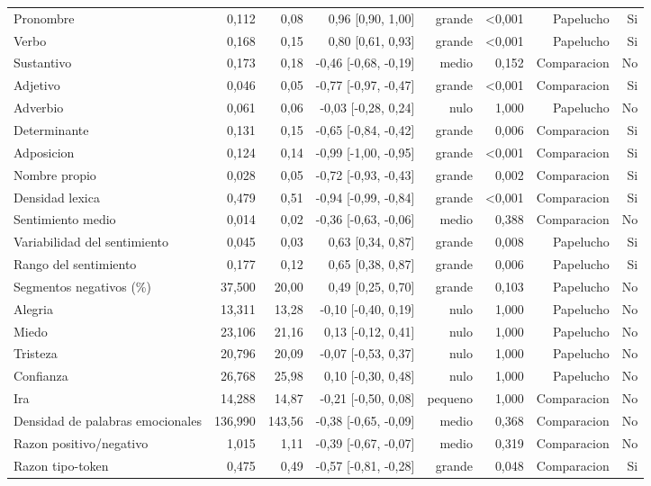 \begin{table}[htbp]
\begin{tabular}{lrrrrrrr}
Pronombre & 0,112 & 0,08 & 0,96 [0,90, 1,00] & grande & <0,001 & Papelucho & Si \\
Verbo & 0,168 & 0,15 & 0,80 [0,61, 0,93] & grande & <0,001 & Papelucho & Si \\
Sustantivo & 0,173 & 0,18 & -0,46 [-0,68, -0,19] & medio & 0,152 & Comparacion & No \\
Adjetivo & 0,046 & 0,05 & -0,77 [-0,97, -0,47] & grande & <0,001 & Comparacion & Si \\
Adverbio & 0,061 & 0,06 & -0,03 [-0,28, 0,24] & nulo & 1,000 & Papelucho & No \\
Determinante & 0,131 & 0,15 & -0,65 [-0,84, -0,42] & grande & 0,006 & Comparacion & Si \\
Adposicion & 0,124 & 0,14 & -0,99 [-1,00, -0,95] & grande & <0,001 & Comparacion & Si \\
Nombre propio & 0,028 & 0,05 & -0,72 [-0,93, -0,43] & grande & 0,002 & Comparacion & Si \\
Densidad lexica & 0,479 & 0,51 & -0,94 [-0,99, -0,84] & grande & <0,001 & Comparacion & Si \\
Sentimiento medio & 0,014 & 0,02 & -0,36 [-0,63, -0,06] & medio & 0,388 & Comparacion & No \\
Variabilidad del sentimiento & 0,045 & 0,03 & 0,63 [0,34, 0,87] & grande & 0,008 & Papelucho & Si \\
Rango del sentimiento & 0,177 & 0,12 & 0,65 [0,38, 0,87] & grande & 0,006 & Papelucho & Si \\
Segmentos negativos (\%) & 37,500 & 20,00 & 0,49 [0,25, 0,70] & grande & 0,103 & Papelucho & No \\
Alegria & 13,311 & 13,28 & -0,10 [-0,40, 0,19] & nulo & 1,000 & Papelucho & No \\
Miedo & 23,106 & 21,16 & 0,13 [-0,12, 0,41] & nulo & 1,000 & Papelucho & No \\
Tristeza & 20,796 & 20,09 & -0,07 [-0,53, 0,37] & nulo & 1,000 & Papelucho & No \\
Confianza & 26,768 & 25,98 & 0,10 [-0,30, 0,48] & nulo & 1,000 & Papelucho & No \\
Ira & 14,288 & 14,87 & -0,21 [-0,50, 0,08] & pequeno & 1,000 & Comparacion & No \\
Densidad de palabras emocionales & 136,990 & 143,56 & -0,38 [-0,65, -0,09] & medio & 0,368 & Comparacion & No \\
Razon positivo/negativo & 1,015 & 1,11 & -0,39 [-0,67, -0,07] & medio & 0,319 & Comparacion & No \\
Razon tipo-token & 0,475 & 0,49 & -0,57 [-0,81, -0,28] & grande & 0,048 & Comparacion & Si \\

\end{tabular}
\end{table}

